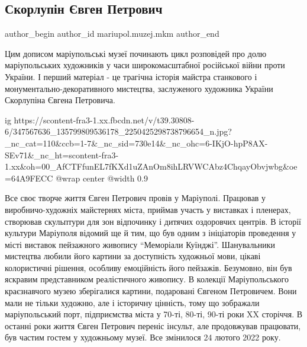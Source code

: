  
 
 
 
 

\subsection{Скорлупін Євген Петрович}
\label{sec:04_07_2023.fb.mariupol.muzej.mkm.1.skorlupin_evgen_petrovich}

\ifcmt
 author_begin
   author_id mariupol.muzej.mkm
 author_end
\fi

Цим дописом маріупольські музеї починають цикл розповідей про долю
маріупольських художників у часи широкомасштабної російської війни проти
України. І перший матеріал  - це трагічна історія майстра станкового і
монументально-декоративного мистецтва, заслуженого художника України Скорлупіна
Євгена Петровича.

\ifcmt
  ig https://scontent-fra3-1.xx.fbcdn.net/v/t39.30808-6/347567636_135799809536178_2250425298738796654_n.jpg?_nc_cat=110&ccb=1-7&_nc_sid=730e14&_nc_ohc=6-IKjO-hpP8AX-SEv71&_nc_ht=scontent-fra3-1.xx&oh=00_AfCTFfunEL7fKXd1uZAnOm8ihLRVWCAbz4ChqayObvjwbg&oe=64A9FECC
  @wrap center
  @width 0.9
\fi

Все своє творче життя  Євген Петрович провів у Маріуполі. Працював у
виробничо-художніх майстернях міста, приймав участь у виставках і пленерах,
створював скульптури для зон відпочинку і дитячих оздоровчих центрів. В історії
культури Маріуполя відомий ще й тим, що був одним з ініціаторів  проведення у
місті виставок пейзажного живопису \enquote{Меморіали Куїнджі}.  Шанувальники
мистецтва любили  його картини за доступність художньої мови, цікаві
колористичні рішення, особливу емоційність його пейзажів. Безумовно, він був
яскравим представником реалістичного живопису. В колекції Маріупольського
краєзнавчого музею зберігалися картини, подаровані Євгеном Петровичем. Вони
мали не тільки художню, але і історичну цінність, тому що зображали
маріупольський порт, підприємства міста у  70-ті, 80-ті, 90-ті роки XX
сторіччя. В останні роки життя Євген Петрович переніс інсульт, але продовжував
працювати, був частим гостем у художньому музеї. Все змінилося 24 лютого 2022
року. 


